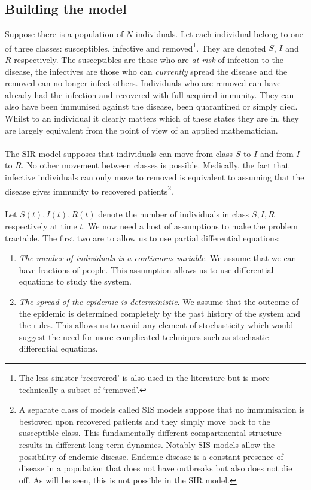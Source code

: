 \subsection{Building the model}
Suppose there is a population of $N$ individuals. Let each individual belong to one of three classes: susceptibles, infective and removed\footnote{The less sinister `recovered' is also used in the literature but is more technically a subset of `removed'.}. They are denoted $S$, $I$ and $R$ respectively. The susceptibles are those who are \textit{at risk} of infection to the disease, the infectives are those who can \textit{currently} spread the disease and the removed can no longer infect others. Individuals who are removed can have already had the infection and recovered with full acquired immunity. They can also have been immunised against the disease, been quarantined or simply died. Whilst to an individual it clearly matters which of these states they are in, they are largely equivalent from the point of view of an applied mathematician.\\
\\
The SIR model supposes that individuals can move from class $S$ to $I$ and from $I$ to $R$. No other movement between classes is possible. Medically, the fact that infective individuals can only move to removed is equivalent to assuming that the disease gives immunity to recovered patients\footnote{A separate class of models called SIS models suppose that no immunisation is bestowed upon recovered patients and they simply move back to the susceptible class. This fundamentally different compartmental structure results in different long term dynamics. Notably SIS models allow the possibility of endemic disease. Endemic disease is a constant presence of disease in a population that does not have outbreaks but also does not die off. As will be seen, this is not possible in the SIR model.}\label{mmd}.\\
\\
Let $S(t),I(t),R(t)$ denote the number of individuals in class $S,I,R$ respectively at time $t$. We now need a host of assumptions to make the problem tractable\cite{models-epidemiology-2}. The first two are to allow us to use partial differential equations:
\begin{enumerate}[noitemsep, label=(\roman*)]
	\item\label{SIR-as-cont} \textit{The number of individuals is a continuous variable}. We assume that we can have fractions of people. This assumption allows us to use differential equations to study the system.
	\item\label{SIR-as-det} \textit{The spread of the epidemic is deterministic}. We assume that the outcome of the epidemic is determined completely by the past history of the system and the rules. This allows us to avoid any element of stochasticity which would suggest the need for more complicated techniques such as stochastic differential equations.
\end{enumerate}
